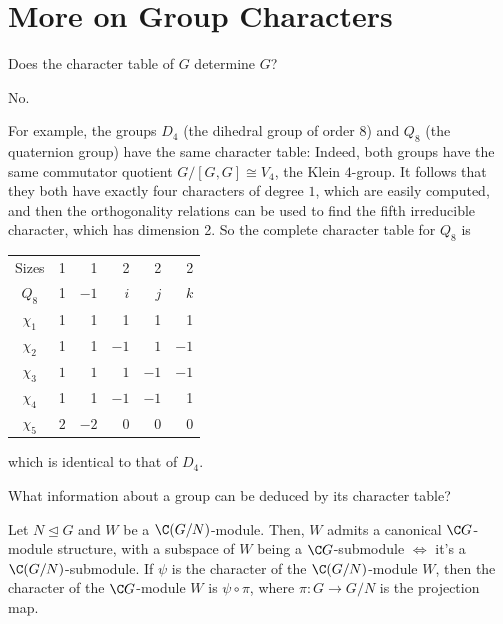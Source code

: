 \section{More on Group Characters}

\begin{notebox*}[Question]
    Does the character table of $G$ determine $G$?
\end{notebox*}

\begin{notebox*}[Answer]
    No.
\end{notebox*}

For example, the groups $D_4$ (the dihedral group of order $8$) and $Q_8$ (the quaternion group) have the same character table: Indeed, both groups have the same commutator quotient $G/[G,G]\cong V_4$, the Klein $4$-group. It follows that they both have exactly four characters of degree $1$, which are easily computed, and then the orthogonality relations can be used to find the fifth irreducible character, which has dimension 2. So the complete character table for $Q_8$ is

\begin{table}[H]
    \centering
    \begin{tabular}{c|rrrrr }
        Sizes & 1 & 1 & 2 & 2 & 2 \\
        $Q_8$ & 1 & $-1$ & $i$ & $j$ & $k$ \\ \hline
        $\chi_1$ & 1 & 1 & 1 & 1 & 1 \\
        $\chi_2$ & 1 & 1 & $-1$ & $1$ & $-1$ \\
        $\chi_3$ & $1$ & $1$ & $1$ & $-1$ & $-1$ \\
        $\chi_4$ & 1 & 1 & $-1$ & $-1$ & 1 \\
       $\chi_5$ & $2$ & $-2$ & 0 & $0$ & 0 \\
    \end{tabular}
\end{table}
which is identical to that of $D_4$.

\begin{notebox*}[Question]
    What information about a group can be deduced by its character table?
\end{notebox*}

\begin{lem}
    Let $N \unlhd G$ and $W$ be a $\C(G/N)$-module. Then, $W$ admits a canonical $\C G$-module structure, with a subspace of $W$ being a $\C G$-submodule $\iff$ it's a $\C(G/N)$-submodule. If $\psi$ is the character of the $\C (G/N)$-module $W$, then the character of the $\C G$-module $W$ is $\psi \circ \pi$, where $\pi:G \to G/N$ is the projection map.
\end{lem}

